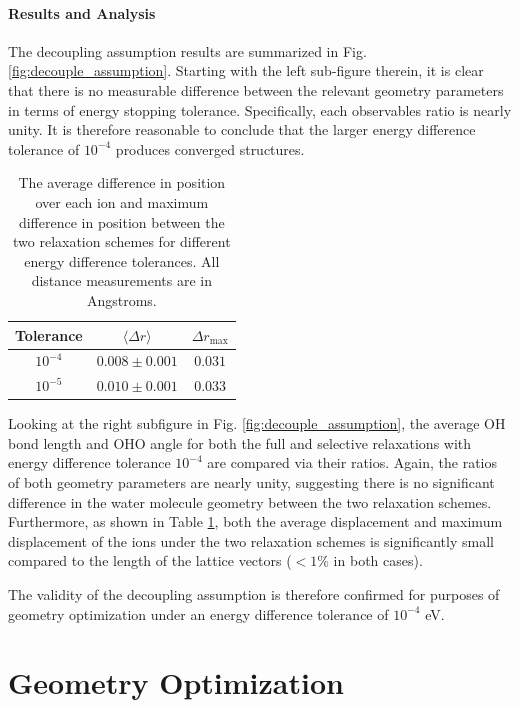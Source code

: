         \paragraph{Results and Analysis} The decoupling assumption results are summarized in Fig. \ref{fig:decouple_assumption}. Starting with the left sub-figure therein, it is clear that there is no measurable difference between the relevant geometry parameters in terms of energy stopping tolerance. Specifically, each observables ratio is nearly unity. It is therefore reasonable to conclude that the larger energy difference tolerance of $10^{-4}$ produces converged structures.
        
        \begin{table}[]
            \centering
            \begin{tabular}{c|c|c}
               Tolerance  & $\langle \Delta r \rangle$ & $\Delta r_\text{max}$  \\
               \hline
               \hline
                $10^{-4}$ & $0.008\pm 0.001$ & $0.031$  \\ 
                $10^{-5}$ & $0.010\pm0.001$& $0.033$ \\ 
            \end{tabular}
            \caption{The average difference in position over each ion and maximum difference in position between the two relaxation schemes for different energy difference tolerances. All distance measurements are in Angstroms.}
            \label{tab:ediff_r_diff}
        \end{table}
        
        Looking at the right subfigure in Fig. \ref{fig:decouple_assumption}, the average OH bond length and OHO angle for both the full and selective relaxations with energy difference tolerance $10^{-4}$ are compared via their ratios. Again, the ratios of both geometry parameters are nearly unity, suggesting there is no significant difference in the water molecule geometry between the two relaxation schemes. Furthermore, as shown in Table \ref{tab:ediff_r_diff}, both the average displacement and maximum displacement of the ions under the two relaxation schemes is significantly small compared to the length of the lattice vectors ($<1\%$ in both cases). 
        
        The validity of the decoupling assumption is therefore confirmed for purposes of geometry optimization under an energy difference tolerance of $10^{-4}$ eV.
        
        
    \section{Geometry Optimization}
    \label{sec:geo_opt}
    
